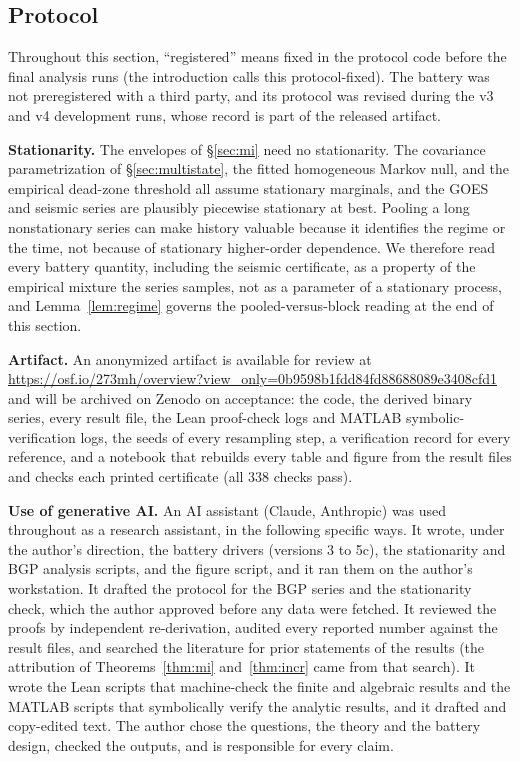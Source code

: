 \documentclass[11pt]{article}
\begin{document}
\subsection{Protocol}\label{sec:protocol}

Throughout this section, ``registered'' means fixed in the protocol code
before the final analysis runs (the introduction calls this protocol-fixed). The battery was not preregistered with a
third party, and its protocol was revised during the v3 and v4
development runs, whose record is part of the released artifact.

\textbf{Stationarity.} The envelopes of \S\ref{sec:mi} need no stationarity.
The covariance parametrization of \S\ref{sec:multistate}, the fitted homogeneous
Markov null, and the empirical dead-zone threshold all assume stationary
marginals, and the GOES and seismic series are plausibly piecewise
stationary at best. Pooling a long nonstationary series can make history
valuable because it identifies the regime or the time, not because of
stationary higher-order dependence. We therefore read every battery
quantity, including the seismic certificate, as a property of the
empirical mixture the series samples, not as a parameter of a stationary
process, and Lemma~\ref{lem:regime} governs the pooled-versus-block
reading at the end of this section.

\textbf{Artifact.} An anonymized artifact is available for review at
\url{https://osf.io/273mh/overview?view_only=0b9598b1fdd84fd88688089e3408cfd1}
and will be archived on Zenodo on acceptance: the code, the derived binary
series, every result file, the Lean proof-check logs and MATLAB
symbolic-verification logs, the seeds of every resampling step, a
verification record for every reference, and a notebook that rebuilds
every table and figure from the result files and checks each printed
certificate (all 338 checks pass).

\textbf{Use of generative AI.} An AI assistant (Claude, Anthropic) was used
throughout as a research assistant, in the following specific ways. It
wrote, under the author's direction, the battery drivers (versions 3 to
5c), the stationarity and BGP analysis scripts, and the figure script, and
it ran them on the author's workstation. It drafted the protocol for the
BGP series and the stationarity check, which the author approved before any
data were fetched. It reviewed the proofs by independent re-derivation,
audited every reported number against the result files, and searched the
literature for prior statements of the results (the attribution of
Theorems~\ref{thm:mi} and~\ref{thm:incr} came from that search). It wrote
the Lean scripts that machine-check the finite and algebraic results and
the MATLAB scripts that symbolically verify the analytic results, and it drafted and copy-edited text. The author chose the
questions, the theory and the battery design, checked the outputs, and is
responsible for every claim.
\end{document}
